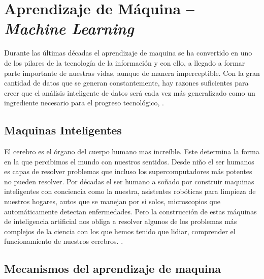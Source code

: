 \section{Aprendizaje de Máquina -- \textit{Machine Learning} }

    Durante las últimas décadas el aprendizaje de maquina se ha convertido en uno de los pilares de la tecnología de la información y con ello, a llegado a formar parte importante de nuestras vidas, aunque de manera imperceptible. Con la gran cantidad de datos que se generan constantemente, hay razones suficientes para creer que el análisis inteligente de datos será cada vez más generalizado como un ingrediente necesario para el progreso tecnológico, \cite{smola2008ml}.

    \subsection{Maquinas Inteligentes}

    El cerebro es el órgano del cuerpo humano mas increíble. Este determina la forma en la que percibimos el mundo con nuestros sentidos. Desde niño el ser humanos es capas de  resolver problemas que incluso los supercomputadores más potentes no pueden resolver. Por décadas el ser humano a soñado por construir maquinas inteligentes con conciencia como la nuestra, asistentes robóticas para limpieza de nuestros hogares, autos que se manejan por si solos, microscopios que automáticamente detectan enfermedades. Pero la construcción de estas máquinas de inteligencia artificial nos obliga a resolver algunos de los problemas más complejos de la ciencia con los que hemos tenido que lidiar, comprender el funcionamiento de nuestros cerebros. \cite{dlBook}.

    \subsection{Mecanismos del aprendizaje de maquina}

